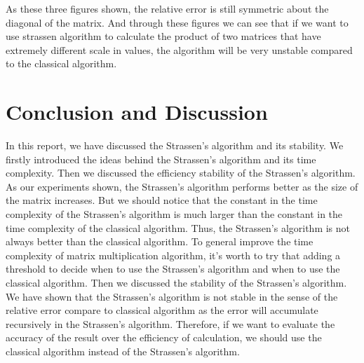 \documentclass{article}
\begin{document}
As these three figures shown, the relative error is still symmetric about the diagonal of the matrix. And through these figures we can see that if we 
want to use strassen algorithm to calculate the product of two matrices that have extremely different scale in values, the algorithm will be very unstable
compared to the classical algorithm.\\

\section{Conclusion and Discussion}
\hspace{5.5mm}In this report, we have discussed the Strassen's algorithm and its stability. We firstly introduced the ideas behind the Strassen's algorithm
and its time complexity. Then we discussed the efficiency stability of the Strassen's algorithm. As our experiments shown, the Strassen's algorithm performs
better as the size of the matrix increases. But we should notice that the constant in the time complexity of the Strassen's algorithm is much larger than the
constant in the time complexity of the classical algorithm. Thus, the Strassen's algorithm is not always better than the classical algorithm. To general improve 
the time complexity of matrix multiplication algorithm, it's worth to try that adding a threshold to decide when to use the Strassen's algorithm and when to use
the classical algorithm. Then we discussed the stability of the Strassen's algorithm. We have shown that the Strassen's algorithm is not stable in the sense of 
the relative error compare to classical algorithm as the error will accumulate recursively in the Strassen's algorithm. Therefore, if we want to evaluate the accuracy
of the result over the efficiency of calculation, we should use the classical algorithm instead of the Strassen's algorithm.\\
\end{document}
